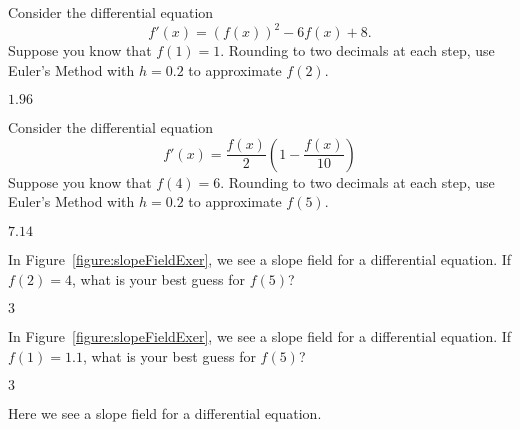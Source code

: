 \begin{exercises}
\begin{exercise}
Consider the differential equation
\[
f'(x) = \left(f(x)\right)^2 - 6f(x) + 8.
\]
Suppose you know that $f(1)= 1$. Rounding to two decimals at each
step, use Euler's Method with $h=0.2$ to approximate $f(2)$. 
\begin{answer}
$1.96$
\end{answer}
\end{exercise}

\begin{exercise}
Consider the differential equation
\[
f'(x) = \frac{f(x)}{2}\left(1-\frac{f(x)}{10}\right)
\]
Suppose you know that $f(4)= 6$. Rounding to two decimals at each
step, use Euler's Method with $h=0.2$ to approximate $f(5)$.
\begin{answer}
$7.14$
\end{answer}
\end{exercise}





\begin{exercise}
In Figure~\ref{figure:slopeFieldExer}, we see a slope field for a
differential equation. If $f(2)=4$, what is your best guess for
$f(5)$?
\begin{answer}
$3$
\end{answer}
\end{exercise}

\begin{exercise}
In Figure~\ref{figure:slopeFieldExer}, we see a slope field for a
differential equation. If $f(1)=1.1$, what is your best guess for
$f(5)$?
\begin{answer}
$3$
\end{answer}
\end{exercise}
\begin{marginfigure}[-2in]
{\def\length{sqrt(1+(-y^2+4*y-3)^2)}
}
\caption{Here we see a slope field for a differential equation.}
\label{figure:slopeFieldExer}
\end{marginfigure}

\end{exercises}
